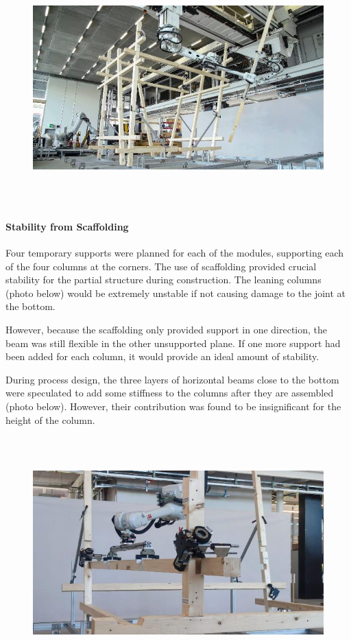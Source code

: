 \documentclass[11pt]{book}
\begin{document}
\begin{figure}[H]
\includegraphics[width=15.92cm,height=8.96cm]{./images/image30.jpeg}
\end{figure}


\paragraph{Stability from Scaffolding}

Four temporary supports were planned for each of the modules, supporting each of the four columns at the corners. The use of scaffolding provided crucial stability for the partial structure during construction. The leaning columns (photo below) would be extremely unstable if not causing damage to the joint at the bottom. 

\vspace{1\baselineskip}
However, because the scaffolding only provided support in one direction, the beam was still flexible in the other unsupported plane. If one more support had been added for each column, it would provide an ideal amount of stability. 

During process design, the three layers of horizontal beams close to the bottom were speculated to add some stiffness to the columns after they are assembled (photo below). However, their contribution was found to be insignificant for the height of the column. 

\begin{figure}[H]
\includegraphics[width=15.92cm,height=8.96cm]{./images/image31.jpeg}
\end{figure}
\end{document}
